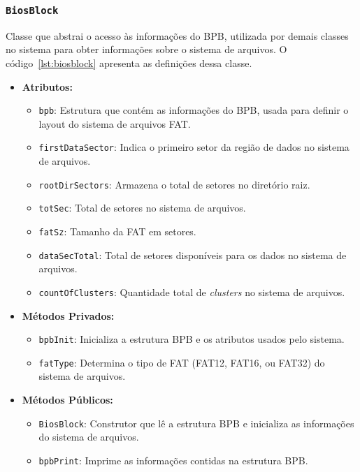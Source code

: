 \documentclass[
    12pt,				%
    oneside,   	        %
    a4paper,			%
    english,			%
    french,				%
    spanish,			%
    brazil,				%
    ]{pacotes/abntex2}
\begin{document}
\subsubsection{\texttt{BiosBlock}}
\label{subsubsec:bios_block}

Classe que abstrai o acesso às informações do BPB, utilizada por demais classes no sistema para obter informações sobre o sistema de arquivos. O código~\ref{lst:biosblock} apresenta as definições dessa classe. 

\begin{itemize}
    \item \textbf{Atributos:}
        \begin{itemize}
            \item \texttt{bpb}: Estrutura que contém as informações do BPB, usada para definir o layout do sistema de arquivos FAT.
            \item \texttt{firstDataSector}: Indica o primeiro setor da região de dados no sistema de arquivos.
            \item \texttt{rootDirSectors}: Armazena o total de setores no diretório raiz.
            \item \texttt{totSec}: Total de setores no sistema de arquivos.
            \item \texttt{fatSz}: Tamanho da FAT em setores.
            \item \texttt{dataSecTotal}: Total de setores disponíveis para os dados no sistema de arquivos.
            \item \texttt{countOfClusters}: Quantidade total de \textit{clusters} no sistema de arquivos.
        \end{itemize}
    \item \textbf{Métodos Privados:}
        \begin{itemize}
            \item \texttt{bpbInit}: Inicializa a estrutura BPB e os atributos usados pelo sistema.
            \item \texttt{fatType}: Determina o tipo de FAT (FAT12, FAT16, ou FAT32) do sistema de arquivos.
        \end{itemize}
    \item \textbf{Métodos Públicos:}
        \begin{itemize}
            \item \texttt{BiosBlock}: Construtor que lê a estrutura BPB e inicializa as informações do sistema de arquivos.
            \item \texttt{bpbPrint}: Imprime as informações contidas na estrutura BPB.

\end{itemize}
\end{itemize}
\end{document}
